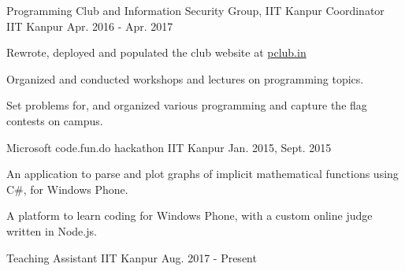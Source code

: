 \vspace{-0.3cm}


\begin{cventries}

  \extraentry
  {Programming Club and Information Security Group, IIT Kanpur}
  {Coordinator}
  {IIT Kanpur}
  {Apr. 2016 - Apr. 2017}
  {
    \begin{cvitems}
    \item Rewrote, deployed and populated the club website at \href{http://pclub.in}{pclub.in}
    \item Organized and conducted workshops and lectures on programming topics.
    \item Set problems for, and organized various programming and capture the flag
      contests on campus.
    \end{cvitems}
  }


  {Microsoft code.fun.do hackathon}
  {IIT Kanpur}
  {Jan. 2015, Sept. 2015}
  {
    \begin{cvitems}
    \item An application to parse and plot graphs of implicit
      mathematical functions using C\#, for Windows Phone.
    \item A platform to learn coding for Windows Phone, with a
      custom online judge written in Node.js.
    \end{cvitems}
  }

  {Teaching Assistant}
  {IIT Kanpur}
  {Aug. 2017 - Present}
  {
  }
  \vspace{-0.3cm}


\end{cventries}

